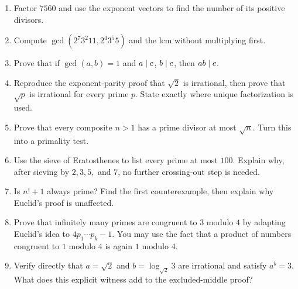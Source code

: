 \begin{exercisebox}
\begin{enumerate}
  \item Factor $7560$ and use the exponent vectors to find the number of its positive divisors. 
  \item Compute $\gcd(2^7 3^2 11,2^4 3^5 5)$ and the lcm without multiplying first. 
  \item Prove that if $\gcd(a,b)=1$ and $a\mid c$, $b\mid c$, then $ab\mid c$. 
  \item Reproduce the exponent-parity proof that $\sqrt2$ is irrational, then prove that $\sqrt p$ is irrational for every prime $p$. State exactly where unique factorization is used. 
  \item Prove that every composite $n>1$ has a prime divisor at most $\sqrt n$. Turn this into a primality test. 
  \item Use the sieve of Eratosthenes to list every prime at most $100$. Explain why, after sieving by $2,3,5,$ and $7$, no further crossing-out step is needed. 
  \item Is $n!+1$ always prime? Find the first counterexample, then explain why Euclid's proof is unaffected. 
  \item Prove that infinitely many primes are congruent to $3$ modulo $4$ by adapting Euclid's idea to $4p_1\cdots p_k-1$. You may use the fact that a product of numbers congruent to $1$ modulo $4$ is again $1$ modulo $4$. 
  \item Verify directly that $a=\sqrt2$ and $b=\log_{\sqrt2}3$ are irrational and satisfy $a^b=3$. What does this explicit witness add to the excluded-middle proof? 
\end{enumerate}
\end{exercisebox}
